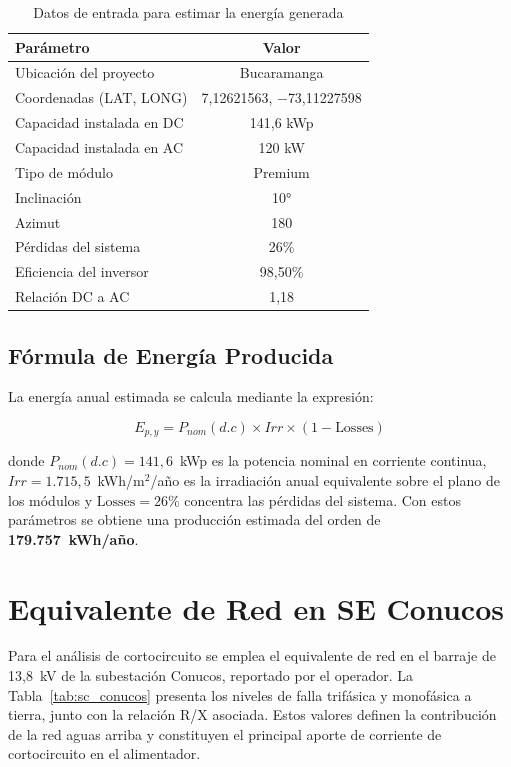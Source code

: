 \begin{table}[H]
    \centering
    \caption{Datos de entrada para estimar la energía generada}
    \label{tab:energia_in}
    \begin{tabular}{lc}
    \toprule
    \textbf{Parámetro} & \textbf{Valor} \\
    \midrule
    Ubicación del proyecto & Bucaramanga \\
    Coordenadas (LAT, LONG) & 7,12621563, $-$73,11227598 \\
    Capacidad instalada en DC & 141,6 kWp \\
    Capacidad instalada en AC & 120 kW \\
    Tipo de módulo & Premium \\
    Inclinación & 10° \\
    Azimut & 180 \\
    Pérdidas del sistema & 26\% \\
    Eficiencia del inversor & 98,50\% \\
    Relación DC a AC & 1,18 \\
    \bottomrule
    \end{tabular}
\end{table}

\subsection{Fórmula de Energía Producida}

La energía anual estimada se calcula mediante la expresión:

\begin{equation}
E_{p,y} = P_{nom}(d.c) \times Irr \times (1 - \text{Losses})
\end{equation}

donde $P_{nom}(d.c)=141,6$~kWp es la potencia nominal en corriente continua, $Irr=1.715,5$~kWh/m$^2$/año es la irradiación anual equivalente sobre el plano de los módulos y $\text{Losses}=26\%$ concentra las pérdidas del sistema. Con estos parámetros se obtiene una producción estimada del orden de \textbf{179.757~kWh/año}.

\section{Equivalente de Red en SE Conucos}

Para el análisis de cortocircuito se emplea el equivalente de red en el barraje de 13,8~kV de la subestación Conucos, reportado por el operador. La Tabla~\ref{tab:sc_conucos} presenta los niveles de falla trifásica y monofásica a tierra, junto con la relación R/X asociada. Estos valores definen la contribución de la red aguas arriba y constituyen el principal aporte de corriente de cortocircuito en el alimentador.

